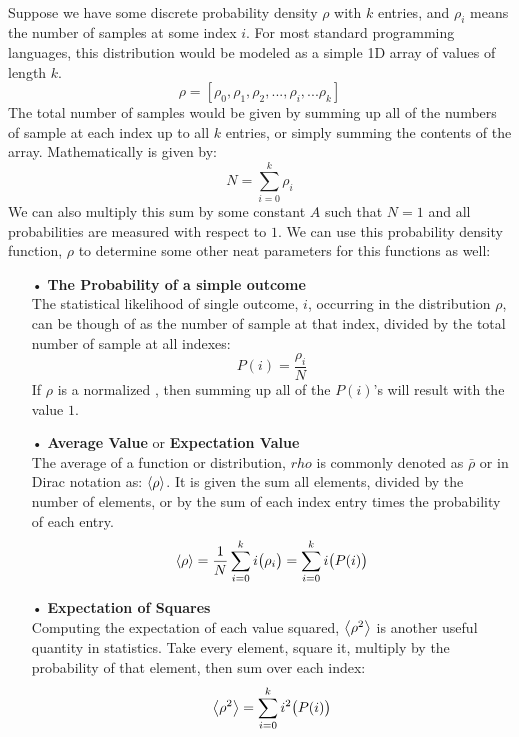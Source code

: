 \documentclass[12pt,letterpaper]{book}
\begin{document}
\paragraph*{}Suppose we have some discrete probability density $\rho$ with $k$ entries, and $\rho_i$ means the number of samples at some index $i$. For most standard programming languages, this distribution would be modeled as a simple 1D array of values of length $k$.
\begin{equation}
\label{rho}
\rho = [ \rho_0 , \rho_1 , \rho_2 , ... , \rho_i , ... \rho_k ]
\end{equation}
The total number of samples would be given by summing up all of the numbers of sample at each index up to all $k$ entries, or simply summing the contents of the array. Mathematically is given by:
\begin{equation}
\label{total disc samples}
N = \sum_{i=0}^{k}\rho_i
\end{equation}
We can also multiply this sum by some constant $A$ such that $N = 1$ and all probabilities are measured with respect to $1$. We can use this probability density function, $\rho$ to determine some other neat parameters for this functions as well:

\begin{enumerate}
\item[•]\textbf{The Probability of a simple outcome}\\
The statistical likelihood of single outcome, $i$, occurring in the distribution $\rho$, can be though of as the number of sample at that index, divided by the total number of sample at all indexes:
\begin{equation}
\label{disc prob}
P(i) = \frac{\rho_i}{N}
\end{equation}
If $\rho$ is a normalized , then summing up all of the $P(i)$'s will result with the value $1$.
\item[•]\textbf{Average Value} or \textbf{Expectation Value}\\
The average of a function or distribution, $rho$ is commonly denoted as $\bar{\rho}$ or in Dirac notation as: $\expval{\rho}$. It is given the sum all elements, divided by the number of elements, or by the sum of each index entry times the probability of each entry.
\begin{equation}
\label{expect val}
\expval{\rho} = \frac{1}{N} \sum_{i=0}^{k} i\big(\rho_i\big) = \sum_{i=0}^{k} i \big(P(i)\big)
\end{equation}
\item[•]\textbf{Expectation of Squares}\\
Computing the expectation of each value squared, $\expval{\rho^2}$ is another useful quantity in statistics. Take every element, square it,  multiply by the probability of that element, then sum over each index:
\begin{equation}
\label{expect val sq}
\expval{\rho^2} = \sum_{i=0}^{k} i^2 \big( P(i) \big)
\end{equation}
\end{enumerate}
\end{document}
